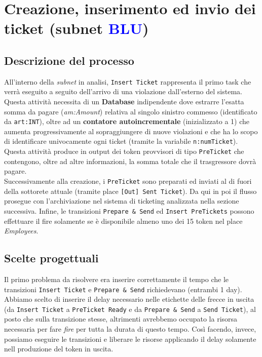 \documentclass[../Relazione.tex]{subfiles}
\begin{document}
\section{Creazione, inserimento ed invio dei ticket \small (subnet  \textcolor{blue}{BLU})}
    
    \subsection{Descrizione del processo}
        All'interno della \textit{subnet} in analisi, \texttt{Insert Ticket} rappresenta il primo task che verrà eseguito a seguito dell'arrivo di una violazione dall'esterno del sistema.
        Questa attività necessita di un \textbf{Database} indipendente dove estrarre l'esatta somma da pagare (\textit{am:Amount}) relativa al singolo sinistro commesso (identificato da \texttt{art:INT}), oltre ad un \textbf{contatore autoincrementale} (inizializzato a 1) che aumenta progressivamente al sopraggiungere di nuove violazioni e che ha lo scopo di identificare univocamente ogni ticket (tramite la variabile \texttt{n:numTicket}).
        Questa attività produce in output dei token provvisori di tipo \texttt{PreTicket} che contengono, oltre ad altre informazioni, la somma totale che il trasgressore dovrà pagare.\\
        Successivamente alla creazione, i \texttt{PreTicket} sono preparati ed inviati al di fuori della sottorete attuale (tramite place \texttt{[Out] Sent Ticket}). Da qui in poi il flusso prosegue con l'archiviazione nel sistema di ticketing analizzata nella sezione successiva.
        Infine, le transizioni \texttt{Prepare \& Send} ed \texttt{Insert PreTickets} possono effettuare il fire solamente se è disponibile almeno uno dei 15 token nel place \textit{Employees}.
        
    \subsection{Scelte progettuali}
        Il primo problema da risolvere era inserire correttamente il tempo che le transizioni \texttt{Insert Ticket} e \texttt{Prepare \& Send} richiedevano (entrambi 1 day). Abbiamo scelto di inserire il delay necessario nelle etichette delle frecce in uscita (da \texttt{Insert Ticket} a \texttt{PreTicket Ready} e da \texttt{Prepare \& Send} a \texttt{Send Ticket}), al posto che sulla transizione stesse, altrimenti avrebbemo occupato la risorsa necessaria per fare \textit{fire} per tutta la durata di questo tempo. Così facendo, invece, possiamo eseguire le transizioni e liberare le risorse applicando il delay solamente nell produzione del token in uscita.\vspace{5mm}
        
\end{document}
